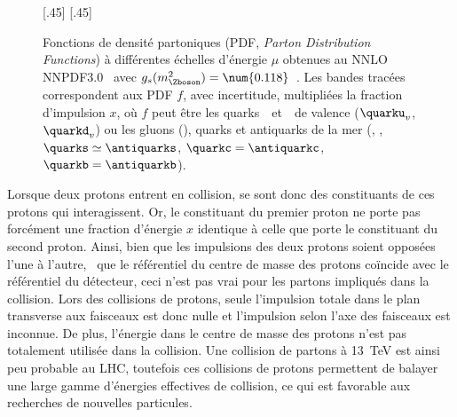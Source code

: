 \begin{figure}[h]
\centering
{}[.45\textwidth]
{}
\hfill
{}[.45\textwidth]
{}
\caption[Fonctions de densité partoniques.]{Fonctions de densité partoniques (PDF, \emph{Parton Distribution Functions}) à différentes échelles d'énergie $\mu$ obtenues au NNLO NNPDF3.0~\cite{NNPDF30} avec $g_s(m_{\Zboson}^2)=\num{0.118}$~\cite{PDG_booklet_2018}. Les bandes tracées correspondent aux PDF $f$, avec incertitude, multipliées la fraction d'impulsion $x$, où $f$ peut être les quarks~\quarku\ et~\quarkd\ de valence ($\quarku_v$, $\quarkd_v$) ou les gluons (\gluon), quarks et antiquarks de la mer (\antiquarku, \antiquarkd, $\quarks\simeq\antiquarks$, $\quarkc=\antiquarkc$, $\quarkb=\antiquarkb$).}
\label{fig-proton_PDFs}
\end{figure}
\par Lorsque deux protons entrent en collision, se sont donc des constituants de ces protons qui interagissent.
Or, le constituant du premier proton ne porte pas forcément une fraction d'énergie $x$ identique à celle que porte le constituant du second proton.
Ainsi, bien que les impulsions des deux protons soient opposées l'une à l'autre, \ie\ que le référentiel du centre de masse des protons coïncide avec le référentiel du détecteur, ceci n'est pas vrai pour les partons impliqués dans la collision.
Lors des collisions de protons, seule l'impulsion totale dans le plan transverse aux faisceaux est donc nulle et l'impulsion selon l'axe des faisceaux est inconnue.
De plus, l'énergie dans le centre de masse des protons n'est pas totalement utilisée dans la collision.
Une collision de partons à \SI{13}{\TeV} est ainsi peu probable au LHC, toutefois ces collisions de protons permettent de balayer une large gamme d'énergies effectives de collision, ce qui est favorable aux recherches de nouvelles particules.
